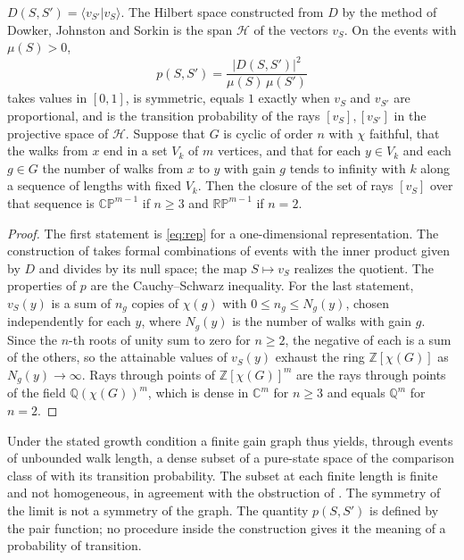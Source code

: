 \begin{proposition}\label{prop:hilbert}
$D(S,S')=\langle v_{S'}|v_S\rangle$. The Hilbert space constructed from $D$ by the method of Dowker, Johnston and Sorkin \cite{djs} is the span $\mathcal{H}$ of the vectors $v_S$. On the events with $\mu(S)>0$,
\[
p(S,S')=\frac{|D(S,S')|^2}{\mu(S)\,\mu(S')}
\]
takes values in $[0,1]$, is symmetric, equals $1$ exactly when $v_S$ and $v_{S'}$ are proportional, and is the transition probability of the rays $[v_S],[v_{S'}]$ in the projective space of $\mathcal{H}$. Suppose that $G$ is cyclic of order $n$ with $\chi$ faithful, that the walks from $x$ end in a set $V_k$ of $m$ vertices, and that for each $y\in V_k$ and each $g\in G$ the number of walks from $x$ to $y$ with gain $g$ tends to infinity with $k$ along a sequence of lengths with fixed $V_k$. Then the closure of the set of rays $[v_S]$ over that sequence is $\mathbb{CP}^{m-1}$ if $n\ge3$ and $\mathbb{RP}^{m-1}$ if $n=2$.
\end{proposition}
\begin{proof}
The first statement is \eqref{eq:rep} for a one-dimensional representation. The construction of \cite{djs} takes formal combinations of events with the inner product given by $D$ and divides by its null space; the map $S\mapsto v_S$ realizes the quotient. The properties of $p$ are the Cauchy--Schwarz inequality. For the last statement, $v_S(y)$ is a sum of $n_g$ copies of $\chi(g)$ with $0\le n_g\le N_g(y)$, chosen independently for each $y$, where $N_g(y)$ is the number of walks with gain $g$. Since the $n$-th roots of unity sum to zero for $n\ge2$, the negative of each is a sum of the others, so the attainable values of $v_S(y)$ exhaust the ring $\mathbb{Z}[\chi(G)]$ as $N_g(y)\to\infty$. Rays through points of $\mathbb{Z}[\chi(G)]^m$ are the rays through points of the field $\mathbb{Q}(\chi(G))^m$, which is dense in $\mathbb{C}^m$ for $n\ge3$ and equals $\mathbb{Q}^m$ for $n=2$.
\end{proof}

Under the stated growth condition a finite gain graph thus yields, through events of unbounded walk length, a dense subset of a pure-state space of the comparison class of \cite{g7} with its transition probability. The subset at each finite length is finite and not homogeneous, in agreement with the obstruction of \cite{g7}. The symmetry of the limit is not a symmetry of the graph. The quantity $p(S,S')$ is defined by the pair function; no procedure inside the construction gives it the meaning of a probability of transition.

